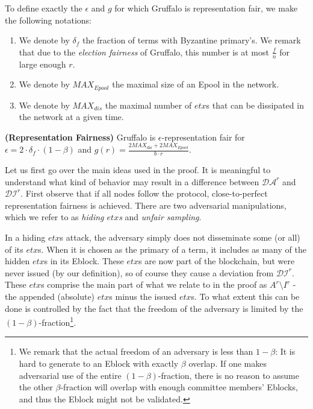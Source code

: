 To define exactly the $\epsilon$ and $g$ for which Gruffalo is representation fair, we make the following notations: 
\begin{enumerate}
    \item We denote by $\delta_f$ the fraction of terms with Byzantine primary's. We remark that due to the \textit{election fairness} of Gruffalo, this number is at most $\frac{f}{n}$ for large enough $r$.
    \item We denote by $MAX_{Epool}$ the maximal size of an Epool in the network. 
    \item We denote by $MAX_{dis}$ the maximal number of $etx$s that can be dissipated in the network at a given time. 
\end{enumerate}


\begin{theorem}{\textbf{(Representation Fairness)}} Gruffalo is $\epsilon$-representation fair for $\epsilon =2\cdot \delta_f\cdot (1-\beta)$ and $g(r)=\frac{2MAX_\text{dis}+2MAX_{Epool}}{b\cdot r}$.
\end{theorem}

Let us first go over the main ideas used in the proof. It is meaningful to understand what kind of behavior may result in a difference between $\mathcal{DA}^r$ and $\mathcal{DI}^r$. First observe that if all nodes follow the protocol, close-to-perfect representation fairness is achieved. 
There are two adversarial manipulations, which we refer to as \emph{hiding $etx$s} and \emph{unfair sampling}.

In a hiding $etx$s attack, the adversary simply does not disseminate some (or all) of its $etx$s. When it is chosen as the primary of a term, it includes as many of the hidden $etx$s in its Eblock. These $etx$s are now part of the blockchain, but were never issued (by our definition), so of course they cause a deviation from $\mathcal{DI}^r$. These $etx$s comprise the main part of what we relate to in the proof as $A^r\setminus I^r$ - the appended (absolute) $etx$s minus the issued $etx$s. To what extent this can be done is controlled by the fact that the freedom of the adversary is limited by the $(1-\beta)$-fraction\footnote{We remark that the actual freedom of an adversary is less than $1-\beta$: It is hard to generate to an Eblock with exactly $\beta$ overlap. If one makes adversarial use of the entire $(1-\beta)$-fraction, there is no reason to assume the other $\beta$-fraction will overlap with enough committee members' Eblocks, and thus the Eblock might not be validated.}. 

